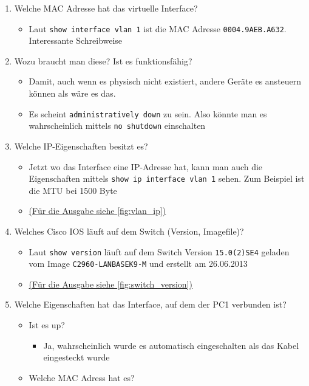 \documentclass{article}
\begin{document}
\begin{enumerate}
\begin{itemize}
		\end{itemize}
		\item{Welche MAC Adresse hat das virtuelle Interface?}
		\begin{itemize}
			\item{Laut \texttt{show interface vlan 1} ist die MAC Adresse \texttt{0004.9AEB.A632}. Interessante Schreibweise}
		\end{itemize}
		\item{Wozu braucht man diese? Ist es funktionsfähig?}
		\begin{itemize}
			\item{Damit, auch wenn es physisch nicht existiert, andere Geräte es ansteuern können als wäre es das.}
			\item{Es scheint \texttt{administratively down} zu sein. Also könnte man es wahrscheinlich mittels \texttt{no shutdown} einschalten}
		\end{itemize}
		\item{Welche IP-Eigenschaften besitzt es?}
		\begin{itemize}
			\item{Jetzt wo das Interface eine IP-Adresse hat, kann man auch die Eigenschaften mittels \texttt{show ip interface vlan 1} sehen. Zum Beispiel ist die MTU bei 1500 Byte}
			\item[]{\hyperref[fig:vlan_ip]{(Für die Ausgabe siehe \ref{fig:vlan_ip})}}
		\end{itemize}
		\item{Welches Cisco IOS läuft auf dem Switch (Version, Imagefile)?}
		\begin{itemize}
			\item{Laut \texttt{show version} läuft auf dem Switch Version \texttt{15.0(2)SE4} geladen vom Image \texttt{C2960-LANBASEK9-M} und erstellt am 26.06.2013}
			\item[]{\hyperref[fig:switch_version]{(Für die Ausgabe siehe \ref{fig:switch_version})}}
		\end{itemize}
		\item{Welche Eigenschaften hat das Interface, auf dem der PC1 verbunden ist?}
		\begin{itemize}
			\item[a.]{Ist es up?}
			\begin{itemize}
				\item{Ja, wahrscheinlich wurde es automatisch eingeschalten als das Kabel eingesteckt wurde}
			\end{itemize}
			\item[b.]{Welche MAC Adress hat es?}

\end{itemize}
\end{enumerate}
\end{document}
